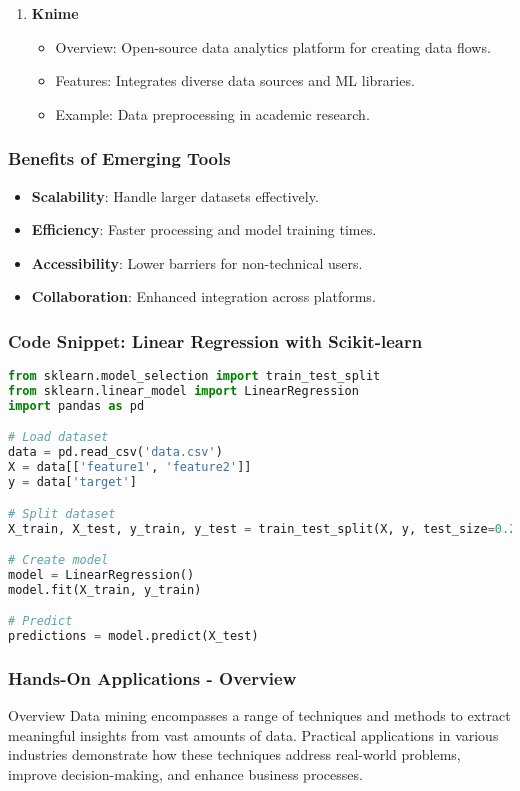 \documentclass{beamer}
\begin{document}
\begin{frame}
\begin{enumerate}
        \item \textbf{Knime}
        \begin{itemize}
            \item Overview: Open-source data analytics platform for creating data flows.
            \item Features: Integrates diverse data sources and ML libraries.
            \item Example: Data preprocessing in academic research.
        \end{itemize}
    \end{enumerate}
\end{frame}

\begin{frame}
    \frametitle{Benefits of Emerging Tools}
    \begin{itemize}
        \item \textbf{Scalability}: Handle larger datasets effectively.
        \item \textbf{Efficiency}: Faster processing and model training times.
        \item \textbf{Accessibility}: Lower barriers for non-technical users.
        \item \textbf{Collaboration}: Enhanced integration across platforms.
    \end{itemize}
\end{frame}

\begin{frame}[fragile]
    \frametitle{Code Snippet: Linear Regression with Scikit-learn}
    \begin{lstlisting}[language=Python]
from sklearn.model_selection import train_test_split
from sklearn.linear_model import LinearRegression
import pandas as pd

# Load dataset
data = pd.read_csv('data.csv')
X = data[['feature1', 'feature2']]
y = data['target']

# Split dataset
X_train, X_test, y_train, y_test = train_test_split(X, y, test_size=0.2)

# Create model
model = LinearRegression()
model.fit(X_train, y_train)

# Predict
predictions = model.predict(X_test)
    \end{lstlisting}
\end{frame}

\begin{frame}[fragile]
    \frametitle{Hands-On Applications - Overview}
    \begin{block}{Overview}
        Data mining encompasses a range of techniques and methods to extract meaningful insights from vast amounts of data. 
        Practical applications in various industries demonstrate how these techniques address real-world problems, improve decision-making, and enhance business processes.
    \end{block}
\end{frame}
\end{document}

